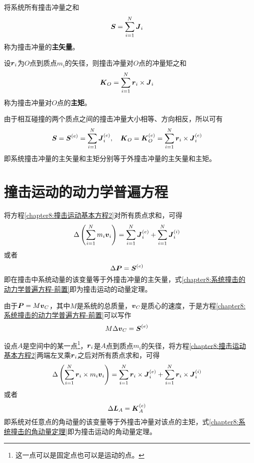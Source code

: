 将系统所有撞击冲量之和
\begin{equation}
	\boldsymbol{S} = \sum_{i=1}^N \boldsymbol{J}_i
\end{equation}
称为撞击冲量的{\bf 主矢量}。

设$\boldsymbol{r}_i$为$O$点到质点$m_i$的矢径，则撞击冲量对$O$点的冲量矩之和
\begin{equation}
	\boldsymbol{K}_O = \sum_{i=1}^N\boldsymbol{r}_i\times \boldsymbol{J}_i
\end{equation}
称为撞击冲量对$O$点的{\bf 主矩}。

由于相互碰撞的两个质点之间的撞击冲量大小相等、方向相反，所以可有
\begin{equation}
	\boldsymbol{S} = \boldsymbol{S}^{(e)} = \sum_{i=1}^N\boldsymbol{J}_i^{(e)},\quad \boldsymbol{K}_O = \boldsymbol{K}_O^{(e)} = \sum_{i=1}^N\boldsymbol{r}_i\times \boldsymbol{J}_i^{(e)}
\end{equation}
即系统撞击冲量的主矢量和主矩分别等于外撞击冲量的主矢量和主矩。

\section{撞击运动的动力学普遍方程}

将方程\eqref{chapter8:撞击运动基本方程2}对所有质点求和，可得
\begin{equation*}
	\Delta \left(\sum_{i=1}^Nm_i\boldsymbol{v}_i\right) = \sum_{i=1}^N\boldsymbol{J}_i^{(e)}+\sum_{i=1}^N\boldsymbol{J}_i^{(i)}
\end{equation*}
或者
\begin{equation}
	\Delta \boldsymbol{P} = \boldsymbol{S}^{(e)}
	\label{chapter8:系统撞击的动力学普遍方程-前置}
\end{equation}
即在撞击中系统动量的该变量等于外撞击冲量的主矢量，式\eqref{chapter8:系统撞击的动力学普遍方程-前置}即为撞击运动的动量定理。

由于$\boldsymbol{P}=M\boldsymbol{v}_C$，其中$M$是系统的总质量，$\boldsymbol{v}_C$是质心的速度，于是方程\eqref{chapter8:系统撞击的动力学普遍方程-前置}可以写作
\begin{equation}
	M\Delta \boldsymbol{v}_C = \boldsymbol{S}^{(e)}
	\label{chapter8:系统撞击的动量定理}
\end{equation}

设点$A$是空间中的某一点\footnote{这一点可以是固定点也可以是运动的点。}，$\boldsymbol{r}_i$是$A$点到质点$m_i$的矢径，将方程\eqref{chapter8:撞击运动基本方程2}两端左叉乘$\boldsymbol{r}_i$之后对所有质点求和，可得
\begin{equation*}
	\Delta \left(\sum_{i=1}^N\boldsymbol{r}_i\times m_i\boldsymbol{v}_i\right) = \sum_{i=1}^N\boldsymbol{r}_i\times \boldsymbol{J}_i^{(e)}+\sum_{i=1}^N\boldsymbol{r}_i\times \boldsymbol{J}_i^{(i)}
\end{equation*}
或者
\begin{equation}
	\Delta\boldsymbol{L}_A = \boldsymbol{K}_A^{(e)}
	\label{chapter8:系统撞击的角动量定理}
\end{equation}
即系统对任意点的角动量的该变量等于外撞击冲量对该点的主矩，式\eqref{chapter8:系统撞击的角动量定理}即为撞击运动的角动量定理。


